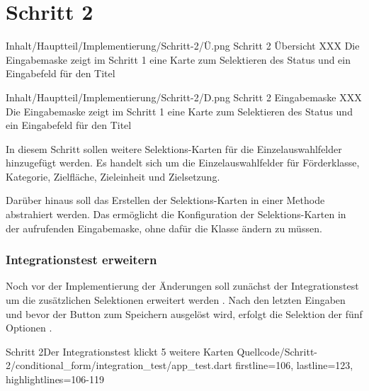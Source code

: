 \ifincludeall \clearpage \fi 





\section{Schritt 2}

\begin{alexfigure}{Inhalt/Hauptteil/Implementierung/Schritt-2/Ü.png}
  {Schritt 2 Übersicht}
  {XXX Die Eingabemaske zeigt im Schritt 1 eine Karte zum Selektieren des Status und ein Eingabefeld für den Titel}

  \label{fig:Schritt2Uebersicht}

\end{alexfigure}

\begin{alexfigure}{Inhalt/Hauptteil/Implementierung/Schritt-2/D.png}
  {Schritt 2 Eingabemaske}
  {XXX Die Eingabemaske zeigt im Schritt 1 eine Karte zum Selektieren des Status und ein Eingabefeld für den Titel}

  \label{fig:Schritt2Eingabemaske}

\end{alexfigure}

In diesem Schritt sollen weitere Selektions-Karten für die Einzelauswahlfelder hinzugefügt werden.
Es handelt sich um die Einzelauswahlfelder für Förderklasse, Kategorie, Zielfläche, Zieleinheit und Zielsetzung. 

Darüber hinaus soll das Erstellen der Selektions-Karten in einer Methode abstrahiert werden.
Das ermöglicht die Konfiguration der Selektions-Karten in der aufrufenden Eingabemaske, ohne dafür die Klasse  ändern zu müssen.

\subsubsection{Integrationstest erweitern}

Noch vor der Implementierung der Änderungen soll zunächst der Integrationstest um die zusätzlichen Selektionen erweitert werden \Lst{\ref{lst:Schritt2IntegrationstestKlickt5WeitereKarten}}. Nach den letzten Eingaben und bevor der Button zum Speichern ausgelöst wird, erfolgt die Selektion der fünf Optionen .   

\begin{alexlisting}{Schritt 2}{Der Integrationstest klickt 5 weitere Karten}
  {Quellcode/Schritt-2/conditional_form/integration_test/app_test.dart}
  {firstline=106, lastline=123, highlightlines={106-119}}
  \label{lst:Schritt2IntegrationstestKlickt5WeitereKarten}
\end{alexlisting}

